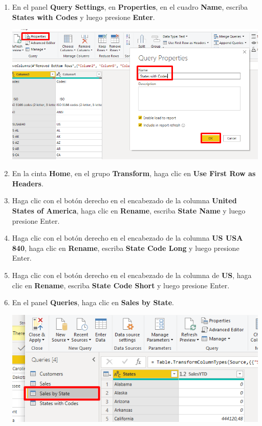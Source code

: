 \documentclass[12pt,letterpaper]{article}
\newcommand\tab[1][1cm]{\hspace*{#1}}
\begin{document}
\begin{enumerate}[\tab 1.]
        \item En el panel \textbf{Query Settings}, en \textbf{Properties}, en el cuadro \textbf{Name}, escriba \textbf{States with Codes} y luego presione \textbf{Enter}.
        \begin{center}
            \includegraphics[width=13cm]{./img/img64.png}
        \end{center}
        \item En la cinta \textbf{Home}, en el grupo \textbf{Transform}, haga clic en \textbf{Use First Row as Headers}.
        \item Haga clic con el botón derecho en el encabezado de la columna \textbf{United States of America}, haga clic en \textbf{Rename}, escriba \textbf{State Name} y luego presione Enter.
        \item Haga clic con el botón derecho en el encabezado de la columna \textbf{US USA 840}, haga clic en \textbf{Rename}, escriba \textbf{State Code Long} y luego presione Enter.
        \item Haga clic con el botón derecho en el encabezado de la columna de \textbf{US}, haga clic en \textbf{Rename}, escriba \textbf{State Code Short} y luego presione Enter.
        \item En el panel \textbf{Queries}, haga clic en \textbf{Sales by State}.
        \begin{center}
            \includegraphics[width=13cm]{./img/img69.png}

\end{center}
\end{enumerate}
\end{document}
